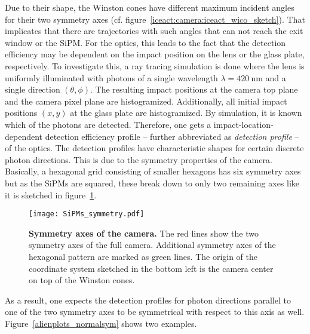 Due to their shape, the Winston cones have different maximum incident angles for their two symmetry axes (cf. figure~\ref{iceact:camera:iceact_wico_sketch}). That implicates that there are trajectories with such angles that can not reach the exit window or the SiPM. For the optics, this leads to the fact that the detection efficiency may be dependent on the impact position on the lens or the glass plate, respectively. To investigate this, a ray tracing simulation is done where the lens is uniformly illuminated with photons of a single wavelength $\lambda=\SI{420}{\nano\meter}$ and a single direction $(\theta,\phi)$. The resulting impact positions at the camera top plane and the camera pixel plane are histogramized. Additionally, all initial impact positions $(x,y)$ at the glass plate are histogramized. By simulation, it is known which of the photons are detected. Therefore, one gets a impact-location-dependent detection efficiency profile -- further abbreviated as \textit{detection profile} -- of the optics.
The detection profiles have characteristic shapes for certain discrete photon directions. This is due to the symmetry properties of the \iceact camera. Basically, a hexagonal grid consisting of smaller hexagons has six symmetry axes but as the SiPMs are squared, these break down to only two remaining axes like it is sketched in figure~\ref{camera:symmetryaxes}.\\

\begin{figure}[H]
	\centering
	\texttt{[image: SiPMs\_symmetry.pdf]}
	\caption[Symmetry axes of the \iceact camera]{\textbf{Symmetry axes of the \iceact camera.} The red lines show the two symmetry axes of the full camera. Additional symmetry axes of the hexagonal pattern are marked as green lines. The origin of the \geant coordinate system sketched in the bottom left is the camera center on top of the Winston cones.}
	\label{camera:symmetryaxes}
\end{figure}

As a result, one expects the detection profiles for photon directions parallel to one of the two symmetry axes to be symmetrical with respect to this axis as well. Figure~\ref{alienplots_normalsym} shows two examples.\\

